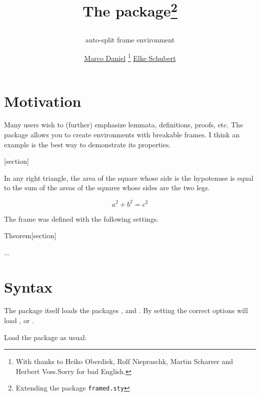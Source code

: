 \documentclass[parskip=false,english,11pt]{ltxmdf}
\title{The \mdname package\footnote{Extending the package \texttt{framed.sty}}
\subtitle{auto-split frame environment}
\author{\href{mailto:marco.daniel@mada-nada.de}{Marco Daniel}%
       \footnote{With thanks to Heiko Oberdiek, Rolf Niepraschk,
                 Martin Scharrer and Herbert Voss.\newline Sorry for bad English.}
          \href{mailto:marco.daniel@mada-nada.de}{Elke Schubert}}}
\date{\svnToday}
\begin{document}
\maketitle


\section{Motivation}
Many users wish to (further) emphasize lemmata, definitions, proofs, etc. The package \mdname allows you to create environments with breakable frames. I think an example is the best way to demonstrate its properties.


[section]

\begin{theorem}
 In any right triangle, the area of the square whose side is the hypotenuse
 is equal to the sum of the areas of the squares whose sides are the two legs.
 
\[ a^2+b^2=c^2 \]
\end{theorem}

The frame was defined with the following settings.

\begin{mdexample}
%
    {Theorem}[section]
\begin{theorem}
...
\end{theorem}
\end{mdexample}


\section{Syntax}\label{sec:syntax}
The package itself loads the packages ,  and .
By setting the correct options  will load ,  or .

Load the package as usual:
\begin{mdexample}
 \usepackage[<GLOBAL OPTIONS>]{mdframed}
\end{mdexample}
\end{document}

